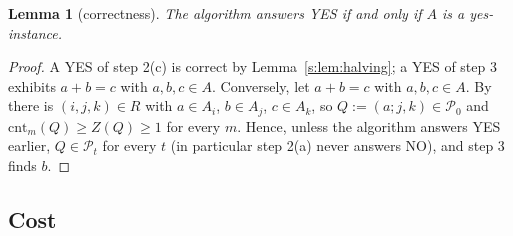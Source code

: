 \documentclass[11pt]{article}
\newtheorem{lemma}[theorem]{Lemma}
\theoremstyle{definition}
\theoremstyle{remark}
\newcommand{\cnt}{\mathrm{cnt}}
\newcommand{\Pq}{\mathcal{P}}
\begin{document}
\begin{lemma}[correctness]\label{s:lem:correct}
The algorithm answers YES if and only if $A$ is a yes-instance.
\end{lemma}
\begin{proof}
A YES of step 2(c) is correct by Lemma~\ref{s:lem:halving}; a YES of step 3 exhibits $a+b=c$ with $a,b,c\in A$. Conversely, let $a+b=c$ with $a,b,c\in A$. By \cite[Lemma~3.3]{FKP24} there is $(i,j,k)\in R$ with $a\in A_i$, $b\in A_j$, $c\in A_k$, so $Q:=(a;j,k)\in\Pq_0$ and $\cnt_m(Q)\ge Z(Q)\ge1$ for every $m$. Hence, unless the algorithm answers YES earlier, $Q\in\Pq_t$ for every $t$ (in particular step 2(a) never answers NO), and step 3 finds $b$.
\end{proof}

\subsection{Cost}\label{s:sec:cost}
\end{document}
